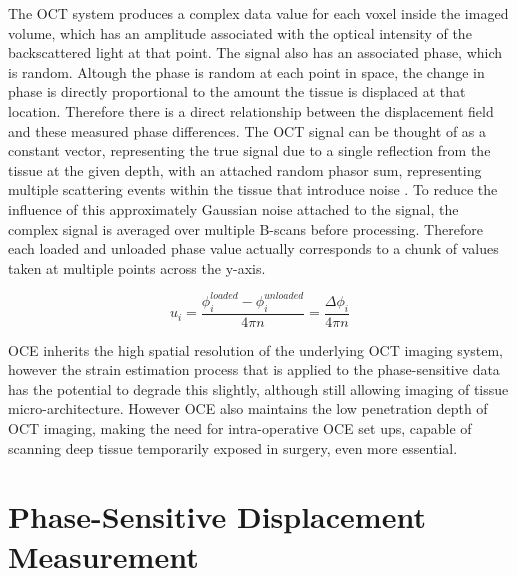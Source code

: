 The OCT system produces a complex data value for each voxel inside the imaged volume, which has an amplitude associated with the optical intensity of the backscattered light at that point. The signal also has an associated phase, which is random. Altough the phase is random at each point in space, the change in phase is directly proportional to the amount the tissue is displaced at that location. Therefore there is a direct relationship between the displacement field and these measured phase differences.
The OCT signal can be thought of as a constant vector, representing the true signal due to a single reflection from the tissue at the given depth, with an attached random phasor sum, representing multiple scattering events within the tissue that introduce noise \cite{goodman_statistical_2015}. To reduce the influence of this approximately Gaussian noise attached to the signal, the complex signal is averaged over multiple B-scans before processing. Therefore each loaded and unloaded phase value actually corresponds to a chunk of values taken at multiple points across the y-axis. 

\begin{equation}
u_i = \frac{\phi_i^{loaded}-\phi_i^{unloaded}}{4\pi n} = \frac{\Delta\phi_i}{4\pi n}
\end{equation}

OCE inherits the high spatial resolution of the underlying OCT imaging system, however the strain estimation process that is applied to the phase-sensitive data has the potential to degrade this slightly, although still allowing imaging of tissue micro-architecture. However OCE also maintains the low penetration depth of OCT imaging, making the need for intra-operative OCE set ups, capable of scanning deep tissue temporarily exposed in surgery, even more essential. 

\section{Phase-Sensitive Displacement Measurement}\label{phase_sensitive}

